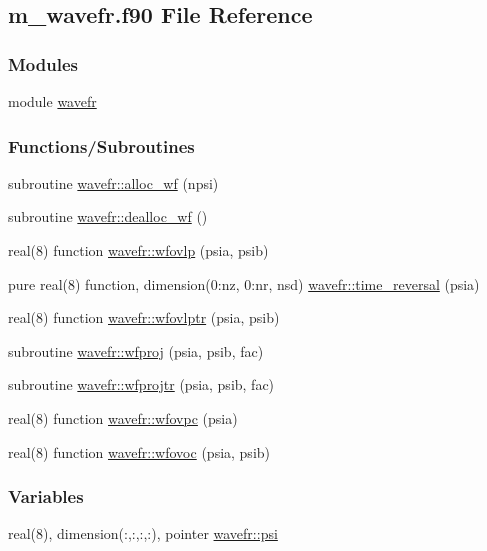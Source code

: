 \hypertarget{m__wavefr_8f90}{}\subsection{m\+\_\+wavefr.\+f90 File Reference}
\label{m__wavefr_8f90}
\subsubsection*{Modules}
\begin{DoxyCompactItemize}
\item 
module \hyperlink{namespacewavefr}{wavefr}
\end{DoxyCompactItemize}
\subsubsection*{Functions/\+Subroutines}
\begin{DoxyCompactItemize}
\item 
subroutine \hyperlink{namespacewavefr_a82c6a57af65c62f9fba38b7eeb46ca8f}{wavefr\+::alloc\+\_\+wf} (npsi)
\item 
subroutine \hyperlink{namespacewavefr_a569f9e92e926f1a2f7b5a9c8efb2907e}{wavefr\+::dealloc\+\_\+wf} ()
\item 
real(8) function \hyperlink{namespacewavefr_a10dc27c35fdb4656b839f63dbc1ccb38}{wavefr\+::wfovlp} (psia, psib)
\item 
pure real(8) function, dimension(0\+:nz, 0\+:nr, nsd) \hyperlink{namespacewavefr_a6941c11e1d1f594c22032dee72d5c67a}{wavefr\+::time\+\_\+reversal} (psia)
\item 
real(8) function \hyperlink{namespacewavefr_aead2efe9f9e481e6a594c93871cce730}{wavefr\+::wfovlptr} (psia, psib)
\item 
subroutine \hyperlink{namespacewavefr_a519281578e3b01a8650657a2ced55e8a}{wavefr\+::wfproj} (psia, psib, fac)
\item 
subroutine \hyperlink{namespacewavefr_a0c4c5f764c196fe4b005f62e9369a1b0}{wavefr\+::wfprojtr} (psia, psib, fac)
\item 
real(8) function \hyperlink{namespacewavefr_a3d95d1d937626dca97d24be282442950}{wavefr\+::wfovpc} (psia)
\item 
real(8) function \hyperlink{namespacewavefr_a82a49ad95ae89423187333e2c1899e4f}{wavefr\+::wfovoc} (psia, psib)
\end{DoxyCompactItemize}
\subsubsection*{Variables}
\begin{DoxyCompactItemize}
\item 
real(8), dimension(\+:,\+:,\+:,\+:), pointer \hyperlink{namespacewavefr_a52b30de869aa8a41afeacaca1874f0f8}{wavefr\+::psi}
\end{DoxyCompactItemize}
